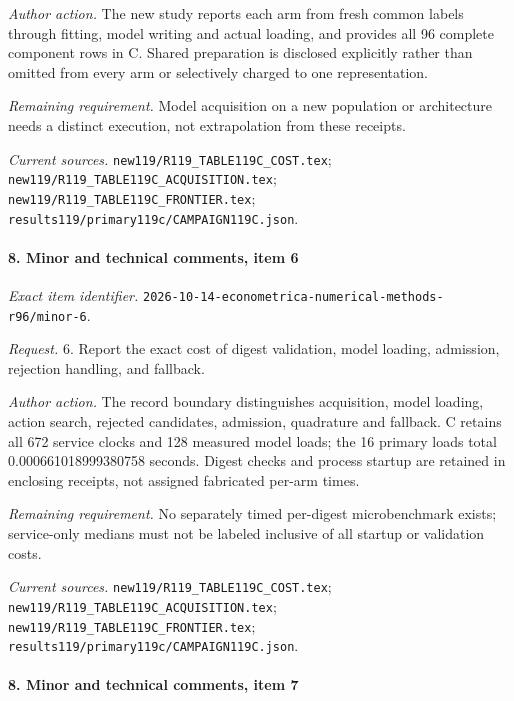 \par\emph{Author action.} The new study reports each arm from fresh common labels through fitting, model writing and actual loading, and provides all 96 complete component rows in C. Shared preparation is disclosed explicitly rather than omitted from every arm or selectively charged to one representation.

\par\emph{Remaining requirement.} Model acquisition on a new population or architecture needs a distinct execution, not extrapolation from these receipts.

\par\emph{Current sources.} \nolinkurl{new119/R119_TABLE119C_COST.tex}; \nolinkurl{new119/R119_TABLE119C_ACQUISITION.tex}; \nolinkurl{new119/R119_TABLE119C_FRONTIER.tex}; \nolinkurl{results119/primary119c/CAMPAIGN119C.json}.

\paragraph{8. Minor and technical comments, item 6}

\emph{Exact item identifier.} \nolinkurl{2026-10-14-econometrica-numerical-methods-r96/minor-6}.

\par\emph{Request.} 6. Report the exact cost of digest validation, model loading, admission, rejection handling, and fallback.

\par\emph{Author action.} The record boundary distinguishes acquisition, model loading, action search, rejected candidates, admission, quadrature and fallback. C retains all 672 service clocks and 128 measured model loads; the 16 primary loads total 0.000661018999380758 seconds. Digest checks and process startup are retained in enclosing receipts, not assigned fabricated per-arm times.

\par\emph{Remaining requirement.} No separately timed per-digest microbenchmark exists; service-only medians must not be labeled inclusive of all startup or validation costs.

\par\emph{Current sources.} \nolinkurl{new119/R119_TABLE119C_COST.tex}; \nolinkurl{new119/R119_TABLE119C_ACQUISITION.tex}; \nolinkurl{new119/R119_TABLE119C_FRONTIER.tex}; \nolinkurl{results119/primary119c/CAMPAIGN119C.json}.

\paragraph{8. Minor and technical comments, item 7}

